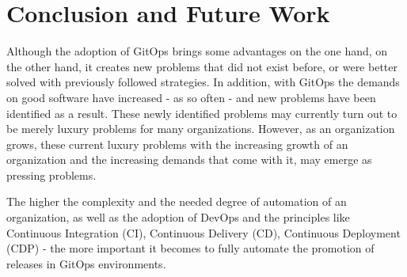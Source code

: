 \chapter{Conclusion and Future Work}

Although the adoption of GitOps brings some advantages on the one hand,
on the other hand, it creates new problems
that did not exist before,
or were better solved with previously followed strategies.
In addition, with GitOps the demands on good software have increased
- as so often -
and new problems have been identified as a result.
These newly identified problems may currently turn out 
to be merely
luxury problems for many organizations.
However, as an organization grows, these current luxury problems
with the increasing growth of an organization
and the increasing demands that come with it,
may emerge as pressing problems.
\bigskip

\noindent
The higher the complexity and the needed degree of automation
of an organization,
as well as the adoption of DevOps
and the principles like
Continuous Integration (CI),
Continuous Delivery (CD),
Continuous Deployment (CDP) -
the more important it becomes to fully automate the promotion of releases in GitOps environments.








